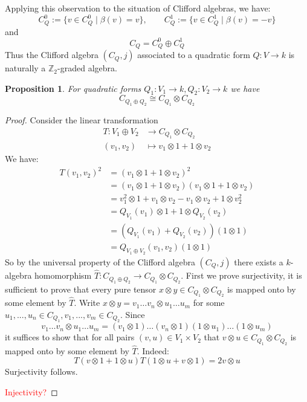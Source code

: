 \documentclass[12pt]{article}
\theoremstyle{plain}
\newtheorem{proposition}[thm]{Proposition}
\theoremstyle{definition}
\newcommand{\bb}[1]{\mathbb{#1}}
\newcommand{\lto}{\longrightarrow}
\begin{document}
	Applying this observation to the situation of Clifford algebras, we have:
	\begin{equation}
		C_Q^0 := \lbrace v \in C_Q^0 \mid \beta(v) = v\rbrace, \qquad C_Q^1 := \lbrace v \in C_Q^1 \mid \beta(v) = -v\rbrace
	\end{equation}
	and
	\begin{equation}
		C_Q = C_Q^0 \oplus C_Q^1
	\end{equation}
	Thus the Clifford algebra $(C_Q,j)$ associated to a quadratic form $Q: V \lto k$ is naturally a $\bb{Z}_2$-graded algebra.
	\begin{proposition}\label{prop:sum_tensor}
		For quadratic forms $Q_1: V_1 \lto k, Q_2: V_2 \lto k$ we have
		\begin{equation}
			C_{Q_1 \oplus Q_2} \cong C_{Q_1} \otimes C_{Q_2}
		\end{equation}
	\end{proposition}
	\begin{proof}
		Consider the linear transformation
		\begin{align*}
			T: V_1 \oplus V_2 &\lto C_{Q_1} \otimes C_{Q_2}\\
			(v_1,v_2) &\longmapsto v_1 \otimes 1 + 1 \otimes v_2
		\end{align*}
		We have:
		\begin{align*}
			T(v_1,v_2)^2 &= (v_1 \otimes 1 + 1 \otimes v_2)^2\\
			&= (v_1 \otimes 1 + 1 \otimes v_2)(v_1 \otimes 1 + 1 \otimes v_2)\\
			&= v_1^2 \otimes 1 + v_1 \otimes v_2 - v_1 \otimes v_2 + 1 \otimes v_2^2\\
			&= Q_{V_1}(v_1) \otimes 1 + 1 \otimes Q_{V_2}(v_2)\\
			&= (Q_{V_1}(v_1) + Q_{V_2}(v_2))(1 \otimes 1)\\
			&= Q_{V_1 \oplus V_2}(v_1,v_2)(1 \otimes 1)
		\end{align*}
		So by the universal property of the Clifford algebra $(C_Q,j)$ there exists a $k$-algebra homomorphism $\hat{T}: C_{Q_1 \oplus Q_2} \lto C_{Q_1} \otimes C_{Q_2}$. First we prove surjectivity, it is sufficient to prove that every pure tensor $x \otimes y \in C_{Q_1} \otimes C_{Q_2}$ is mapped onto by some element by $\hat{T}$. Write $x \otimes y = v_1\hdots v_n \otimes u_1 \hdots u_m$ for some $u_1,...,u_n \in C_{Q_1}, v_1,...,v_m \in C_{Q_2}$. Since
		\begin{equation}
			v_1\hdots v_n \otimes u_1 \hdots u_m = (v_1 \otimes 1)\hdots(v_n \otimes 1)(1 \otimes u_1)\hdots (1 \otimes u_m)
		\end{equation}
		it suffices to show that for all pairs $(v,u) \in V_1 \times V_2$ that $v \otimes u \in C_{Q_1} \otimes C_{Q_2}$ is mapped onto by some element by $\hat{T}$. Indeed:
		\begin{equation}
			T(v \otimes 1 + 1 \otimes u)T(1 \otimes u + v \otimes 1) = 2v\otimes u
		\end{equation}
		Surjectivity follows.
		
		\textcolor{red}{Injectivity?}
	\end{proof}
\end{document}
